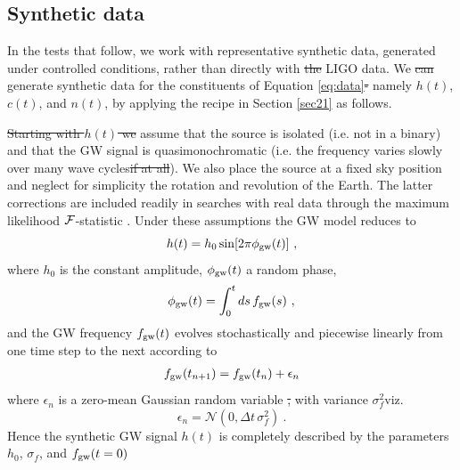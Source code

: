 \documentclass[pra,superscriptaddress,reprint,amsmath,amssymb,nofootinbib]{revtex4-2}
\providecommand{\DIFaddtex}[1]{{\protect\color{blue}\uwave{#1}}} %
\providecommand{\DIFdeltex}[1]{{\protect\color{red}\sout{#1}}}                      %
\providecommand{\DIFaddbegin}{} %
\providecommand{\DIFaddend}{} %
\providecommand{\DIFdelbegin}{} %
\providecommand{\DIFdelend}{} %
\providecommand{\DIFadd}[1]{\texorpdfstring{\DIFaddtex{#1}}{#1}} %
\providecommand{\DIFdel}[1]{\texorpdfstring{\DIFdeltex{#1}}{}} %
\newcommand{\DIFscaledelfig}{0.5}
\newlength{\DIFdelgraphicswidth} %
\newlength{\DIFdelgraphicsheight} %
\newcommand{\DIFaddincludegraphics}[2][]{{\color{blue}\fbox{\DIFOincludegraphics[#1]{#2}}}} %
\newcommand{\DIFdelincludegraphics}[2][]{%
\sbox{\DIFdelgraphicsbox}{\DIFOincludegraphics[#1]{#2}}%
\settoboxwidth{\DIFdelgraphicswidth}{\DIFdelgraphicsbox} %
\settoboxtotalheight{\DIFdelgraphicsheight}{\DIFdelgraphicsbox} %
\scalebox{\DIFscaledelfig}{%
\parbox[b]{\DIFdelgraphicswidth}{\usebox{\DIFdelgraphicsbox}\\[-\baselineskip] \rule{\DIFdelgraphicswidth}{0em}}\llap{\resizebox{\DIFdelgraphicswidth}{\DIFdelgraphicsheight}{%
\setlength{\unitlength}{\DIFdelgraphicswidth}%
\begin{picture}(1,1)%
\thicklines\linethickness{2pt} %
{\color[rgb]{1,0,0}\put(0,0){\framebox(1,1){}}}%
{\color[rgb]{1,0,0}\put(0,0){\line( 1,1){1}}}%
{\color[rgb]{1,0,0}\put(0,1){\line(1,-1){1}}}%
\end{picture}%
}\hspace*{3pt}}} %
} %
\DeclareRobustCommand{\DIFaddbegin}{\DIFOaddbegin \let\includegraphics\DIFaddincludegraphics} %
\DeclareRobustCommand{\DIFaddend}{\DIFOaddend \let\includegraphics\DIFOincludegraphics} %
\DeclareRobustCommand{\DIFdelbegin}{\DIFOdelbegin \let\includegraphics\DIFdelincludegraphics} %
\DeclareRobustCommand{\DIFdelend}{\DIFOaddend \let\includegraphics\DIFOincludegraphics} %
\begin{document}
\subsection{Synthetic data} \label{sec:creating_data}
In the tests that follow, we work with representative synthetic data, generated under controlled conditions, rather than directly with \DIFdelbegin \DIFdel{the }\DIFdelend LIGO data. We \DIFdelbegin \DIFdel{can }\DIFdelend generate synthetic data for the constituents of Equation \eqref{eq:data}\DIFdelbegin \DIFdel{- }\DIFdelend \DIFaddbegin \DIFadd{, }\DIFaddend namely $h(t)$, $c(t)$, and $n(t)$, by applying the recipe in Section \ref{sec21} as follows. \newline 

\DIFdelbegin \DIFdel{Starting with $h(t)$ we }\DIFdelend \DIFaddbegin \DIFadd{We }\DIFaddend assume that the source is isolated (i.e. not in a binary) and that the GW signal is quasimonochromatic (i.e. the frequency varies slowly over many wave cycles\DIFdelbegin \DIFdel{if at all}\DIFdelend ). We also place the source at a fixed sky position and neglect for simplicity the rotation and revolution of the Earth. The latter corrections are included readily in searches with real data through the maximum likelihood ${\cal F}$-statistic \citep{Jaranowski1998}. Under these assumptions the GW model reduces to 
\begin{equation}
	h(t) = h_0\sin[2\pi \phi_{\rm gw}(t)] \ , 
\end{equation}
where $h_0$ is the constant amplitude, $\phi_{\rm gw}(t)$ \DIFaddbegin \DIFadd{is }\DIFaddend a random phase,
\begin{equation}
	\phi_{\rm gw}(t) = \int_{0}^{t} ds \, f_{\rm gw}(s)  \ ,
\end{equation}
and the GW frequency $f_{\rm gw}(t)$ evolves stochastically and piecewise linearly from one time step to the next according to
\begin{eqnarray}
	f_{\rm gw}(t_{n+1}) = f_{\rm gw}(t_n) + \epsilon_n 
\end{eqnarray}
where $\epsilon_n$ is a zero-mean Gaussian random variable \DIFdelbegin \DIFdel{, }\DIFdelend with variance $\sigma_f^2$\DIFaddbegin \DIFadd{, }\DIFaddend viz.
\begin{equation}
	\epsilon_n = \mathcal{N}(0, \Delta t  \, \sigma_f^2) \ . \label{eq:gwfreqnoise}
\end{equation}
Hence the synthetic GW signal $h(t)$ is completely described by the parameters $h_0$, $\sigma_f$, and $f_{\rm gw}(t=0)$ \newline 
\end{document}
